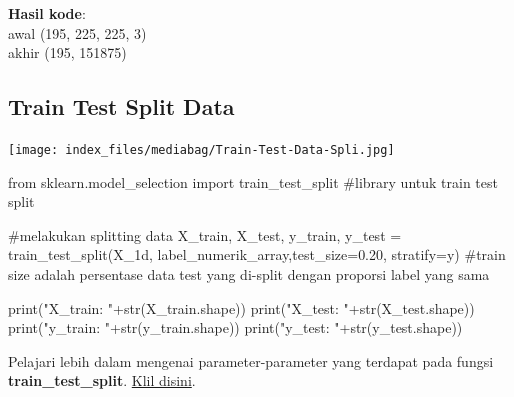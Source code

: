 \documentclass[
  letterpaper,
  DIV=11,
  numbers=noendperiod]{scrreprt}
\newenvironment{Shaded}{\begin{snugshade}}{\end{snugshade}}
\newcommand{\BuiltInTok}[1]{\textcolor[rgb]{0.00,0.23,0.31}{#1}}
\newcommand{\CommentTok}[1]{\textcolor[rgb]{0.37,0.37,0.37}{#1}}
\newcommand{\FloatTok}[1]{\textcolor[rgb]{0.68,0.00,0.00}{#1}}
\newcommand{\ImportTok}[1]{\textcolor[rgb]{0.00,0.46,0.62}{#1}}
\newcommand{\NormalTok}[1]{\textcolor[rgb]{0.00,0.23,0.31}{#1}}
\newcommand{\OperatorTok}[1]{\textcolor[rgb]{0.37,0.37,0.37}{#1}}
\newcommand{\StringTok}[1]{\textcolor[rgb]{0.13,0.47,0.30}{#1}}
\begin{document}
\textbf{Hasil kode}:\\
awal (195, 225, 225, 3)\\
akhir (195, 151875)

\hypertarget{train-test-split-data-2}{%
\subsection*{Train Test Split Data}\label{train-test-split-data-2}}

\texttt{[image: index\_files/mediabag/Train-Test-Data-Spli.jpg]}

\begin{Shaded}
\begin{Highlighting}[]
\ImportTok{from}\NormalTok{ sklearn.model\_selection }\ImportTok{import}\NormalTok{ train\_test\_split }\CommentTok{\#library untuk train test split}

\CommentTok{\#melakukan splitting data}
\NormalTok{X\_train, X\_test, y\_train, y\_test }\OperatorTok{=}\NormalTok{ train\_test\_split(X\_1d, label\_numerik\_array,test\_size}\OperatorTok{=}\FloatTok{0.20}\NormalTok{, stratify}\OperatorTok{=}\NormalTok{y) }
\CommentTok{\#train size adalah persentase data test yang di{-}split dengan proporsi label yang sama}

\BuiltInTok{print}\NormalTok{(}\StringTok{"X\_train: "}\OperatorTok{+}\BuiltInTok{str}\NormalTok{(X\_train.shape))}
\BuiltInTok{print}\NormalTok{(}\StringTok{"X\_test: "}\OperatorTok{+}\BuiltInTok{str}\NormalTok{(X\_test.shape))}
\BuiltInTok{print}\NormalTok{(}\StringTok{"y\_train: "}\OperatorTok{+}\BuiltInTok{str}\NormalTok{(y\_train.shape))}
\BuiltInTok{print}\NormalTok{(}\StringTok{"y\_test: "}\OperatorTok{+}\BuiltInTok{str}\NormalTok{(y\_test.shape))}
\end{Highlighting}
\end{Shaded}

\begin{tcolorbox}[enhanced jigsaw, opacityback=0, colbacktitle=quarto-callout-tip-color!10!white, breakable, titlerule=0mm, left=2mm, toptitle=1mm, rightrule=.15mm, leftrule=.75mm, colback=white, opacitybacktitle=0.6, arc=.35mm, toprule=.15mm, coltitle=black, colframe=quarto-callout-tip-color-frame, bottomtitle=1mm, title=\textcolor{quarto-callout-tip-color}{\faLightbulb}\hspace{0.5em}{Tip}, bottomrule=.15mm]

Pelajari lebih dalam mengenai parameter-parameter yang terdapat pada
fungsi \textbf{train\_test\_split}.
\href{https://scikit-learn.org/stable/modules/generated/sklearn.model_selection.train_test_split.html}{Klil
disini}.

\end{tcolorbox}
\end{document}
